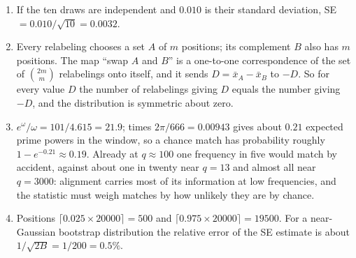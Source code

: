 \begin{enumerate}
\item[26.] If the ten draws are independent and $0.010$ is their standard deviation, SE $=0.010/\sqrt{10}=0.0032$.
\item[27.] Every relabeling chooses a set $A$ of $m$ positions; its complement $B$ also has $m$ positions. The map ``swap $A$ and $B$'' is a one-to-one correspondence of the set of $\binom{2m}{m}$ relabelings onto itself, and it sends $D=\bar x_A-\bar x_B$ to $-D$. So for every value $D$ the number of relabelings giving $D$ equals the number giving $-D$, and the distribution is symmetric about zero.
\item[29.] $e^\omega/\omega=101/4.615=21.9$; times $2\pi/666=0.00943$ gives about $0.21$ expected prime powers in the window, so a chance match has probability roughly $1-e^{-0.21}\approx0.19$. Already at $q\approx100$ one frequency in five would match by accident, against about one in twenty near $q=13$ and almost all near $q=3000$: alignment carries most of its information at low frequencies, and the statistic must weigh matches by how unlikely they are by chance.
\item[31.] Positions $\lceil0.025\times20000\rceil=500$ and $\lceil0.975\times20000\rceil=19500$. For a near-Gaussian bootstrap distribution the relative error of the SE estimate is about $1/\sqrt{2B}=1/200=0.5\%$.
\end{enumerate}
